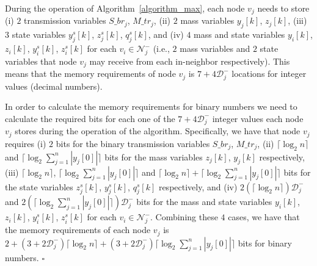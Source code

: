 \documentclass[twocolumn]{autart}    %
\begin{document}
\begin{pf}
During the operation of Algorithm~\ref{algorithm_max}, each node $v_j$ needs to store (i) $2$ transmission variables $S\_br_j$, $M\_tr_j$, (ii) $2$ mass variables $y_j[k]$, $z_j[k]$, (iii) $3$ state variables $y^s_j[k]$, $z^s_j[k]$, $q^s_j[k]$, and (iv) $4$ mass and state variables $y_i[k]$, $z_i[k]$, $y^s_i[k]$, $z^s_i[k]$ for each $v_i \in \mathcal{N}_j^-$ (i.e., $2$ mass variables and $2$ state variables that node $v_j$ may receive from each in-neighbor respectively). 
This means that the memory requirements of node $v_j$ is $7 + 4 \mathcal{D}_{j}^-$ locations for integer values (decimal numbers). 

In order to calculate the memory requirements for binary numbers we need to calculate the required bits for each one of the $7 + 4 \mathcal{D}_{j}^-$ integer values each node $v_j$ stores during the operation of the algorithm. Specifically, we have that node $v_j$ requires (i) $2$ bits for the binary transmission variables $S\_br_j$, $M\_tr_j$, (ii) $\lceil \log_{2} n \rceil$ and $\lceil \log_{2} \sum_{j=1}^n | y_j[0] | \rceil$ bits for the mass variables $z_j[k]$, $y_j[k]$ respectively, (iii) $\lceil \log_{2} n \rceil$, $\lceil \log_{2} \sum_{j=1}^n | y_j[0] | \rceil$ and $\lceil \log_{2} n \rceil + \lceil \log_{2} \sum_{j=1}^n | y_j[0] | \rceil$ bits for the state variables $z^s_j[k]$, $y^s_j[k]$, $q^s_j[k]$ respectively, and (iv) $2 ( \lceil \log_{2} n \rceil ) \mathcal{D}_{j}^-$ and $2 ( \lceil \log_{2} \sum_{j=1}^n | y_j[0] | \rceil ) \mathcal{D}_{j}^-$ bits for the mass and state variables $y_i[k]$, $z_i[k]$, $y^s_i[k]$, $z^s_i[k]$ for each $v_i \in \mathcal{N}_j^-$. 
Combining these $4$ cases, we have that the memory requirements of each node $v_j$ is $ 2 + (3 + 2\mathcal{D}_{j}^-) \lceil \log_{2} n \rceil + (3 + 2\mathcal{D}_{j}^-) \lceil \log_{2} \sum_{j=1}^n | y_j[0] | \rceil $ bits for binary numbers.  \hspace*{\fill} $\square$
\end{pf}
\end{document}
